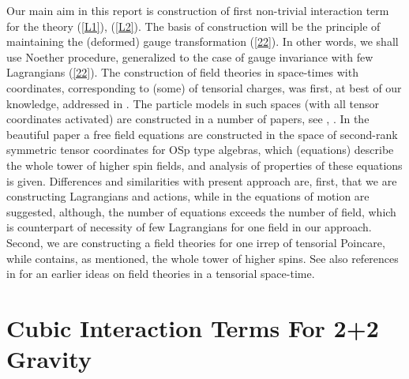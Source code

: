 \documentclass[a4paper,12pt]{article}
\begin{document}
 Our main aim in this report is construction of first
non-trivial interaction term for the theory (\ref{L1}),
(\ref{L2}). The basis of construction will be the principle of
maintaining the (deformed) gauge transformation (\ref{22}). In
other words, we shall use Noether procedure, generalized to the
case of gauge invariance with few Lagrangians (\ref{22}).
    The construction of field theories in space-times with
coordinates, corresponding to (some) of tensorial charges, was
first, at best of our knowledge, addressed in \cite{Man1}. The
particle models in such spaces (with all tensor coordinates
activated) are constructed in a number of papers, see \cite{Rud},
\cite{Band}. In the beautiful paper \cite{Vas} a free field
equations are constructed  in the space of second-rank symmetric
tensor coordinates for OSp type algebras, which (equations)
describe the whole tower of higher spin fields, and analysis of
properties of these equations is given. Differences and
similarities with present approach are, first, that we are
constructing Lagrangians and actions, while in \cite{Vas} the
equations of motion are suggested, although, the number of
equations exceeds the number of field, which is counterpart of
necessity of few Lagrangians for one field in our approach.
Second, we are constructing a field theories for one irrep of
tensorial Poincare, while \cite{Vas} contains, as mentioned, the
whole tower of higher spins. See also references in \cite{Vas} for
an earlier ideas on field theories in a tensorial space-time.

\section{Cubic Interaction Terms For 2+2 Gravity}
\end{document}
